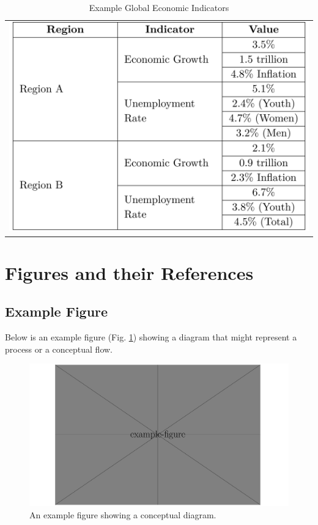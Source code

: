 \documentclass[a4paper]{article}
\begin{document}
\begin{table}[htbp]
    \centering
    \caption{Example Global Economic Indicators}
    \label{tab:tab_table3}
    \begin{tabular}{l}
    \includegraphics[width=\linewidth]{tab_table3.png}
    \end{tabular}
\end{table}



\section{Figures and their References}

\subsection{Example Figure}

Below is an example figure (Fig. \ref{multifig:multifig_examplefig}) showing a diagram that might represent a process or a conceptual flow.


\begin{figure}[htbp]
    \centering
    \includegraphics[width=\linewidth]{multifig_examplefig.png}
    \caption{
        An example figure showing a conceptual diagram.
    }
    \label{multifig:multifig_examplefig}
\end{figure}
\end{document}
